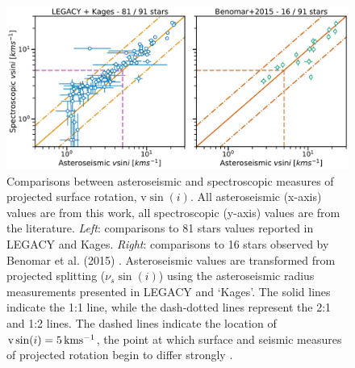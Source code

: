  
 \begin{figure}[h!]
 	\centering
 	\includegraphics[width=\textwidth]{Images/vsini_comparison_new.pdf}
 	\caption{Comparisons between asteroseismic and spectroscopic measures of projected surface rotation, $\textrm{v}\sin(i)$. All asteroseismic (x-axis) values are from this work, all spectroscopic (y-axis) values are from the literature. \textit{Left}: comparisons to 81 stars values reported in LEGACY and Kages. \textit{Right}: comparisons to 16 stars observed by Benomar et al. (2015) \cite{m_benomar+2015}. Asteroseismic values are transformed from projected splitting ($\nu_s\sin(i)$) using the asteroseismic radius measurements presented in LEGACY and `Kages'. The solid lines indicate the 1:1 line, while the dash-dotted lines represent the 2:1 and 1:2 lines. The dashed lines indicate the location of $\textrm{v}\sin(i) = 5\, \rm{kms^{-1}}$, the point at which surface and seismic measures of projected rotation begin to differ strongly \cite{m_tayar+2015}.}
 	\label{fig:vsinilit}
 \end{figure}


 